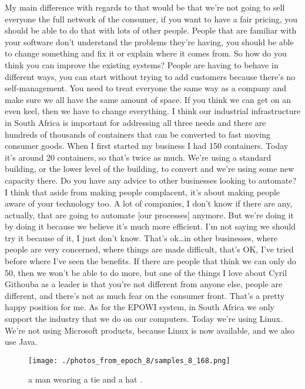 \documentclass{article}%
\begin{document}
My main difference with regards to that would be that we’re not going to sell everyone the full network of the consumer, if you want to have a fair pricing, you should be able to do that with lots of other people.\newline%
People that are familiar with your software don’t understand the problems they’re having, you should be able to change something and fix it or explain where it comes from.\newline%
So how do you think you can improve the existing systems?\newline%
People are having to behave in different ways, you can start without trying to add customers because there’s no self{-}management. You need to treat everyone the same way as a company and make sure we all have the same amount of space.\newline%
If you think we can get on an even keel, then we have to change everything. I think our industrial infrastructure in South Africa is important for addressing all three needs and there are hundreds of thousands of containers that can be converted to fast moving consumer goods.\newline%
When I first started my business I had 150 containers. Today it’s around 20 containers, so that’s twice as much.\newline%
We’re using a standard building, or the lower level of the building, to convert and we’re using some new capacity there.\newline%
Do you have any advice to other businesses looking to automate?\newline%
I think that aside from making people complacent, it’s about making people aware of your technology too.\newline%
A lot of companies, I don’t know if there are any, actually, that are going to automate {[}our processes{]} anymore.\newline%
But we’re doing it by doing it because we believe it’s much more efficient. I’m not saying we should try it because of it, I just don’t know.\newline%
That’s ok…in other businesses, where people are very concerned, where things are made difficult, that’s OK, I’ve tried before where I’ve seen the benefits.\newline%
If there are people that think we can only do 50, then we won’t be able to do more, but one of the things I love about Cyril Githouba as a leader is that you’re not different from anyone else, people are different, and there’s not as much fear on the consumer front.\newline%
That’s a pretty happy position for me.\newline%
As for the EPOWI system, in South Africa we only support the industry that we do on our computers.\newline%
Today we’re using Linux.\newline%
We’re not using Microsoft products, because Linux is now available, and we also use Java.\newline%

%


\begin{figure}[h!]%
\centering%
\texttt{[image: ./photos\_from\_epoch\_8/samples\_8\_168.png]}%
\caption{a man wearing a tie and a hat .}%
\end{figure}

%
\end{document}
